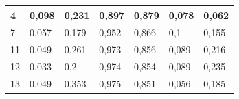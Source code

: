 \documentclass{classrep}
\begin{document}
{\begin{table}[H]
\begin{center}
\begin{tabular}{|l|l|l|l|l|l|l|}
4                                                                  & 0,098                                                                  & 0,231                                                                     & 0,897                                                         & 0,879                                                            & 0,078                                                            & 0,062                                                                \\ \hline
7                                                                  & 0,057                                                                  & 0,179                                                                     & 0,952                                                         & 0,866                                                            & 0,1                                                              & 0,155                                                                \\ \hline
11                                                                 & 0,049                                                                  & 0,261                                                                     & 0,973                                                         & 0,856                                                            & 0,089                                                            & 0,216                                                                \\ \hline
12                                                                 & 0,033                                                                  & 0,2                                                                       & 0,974                                                         & 0,854                                                            & 0,089                                                            & 0,235                                                                \\ \hline
13                                                                 & 0,049                                                                  & 0,353                                                                     & 0,975                                                         & 0,851                                                            & 0,056                                                            & 0,185                                                                \\ \hline

\end{tabular}
\end{center}
\end{table}}
\end{document}
